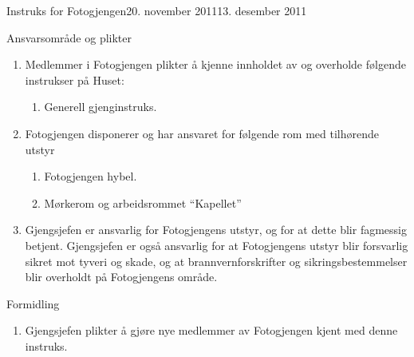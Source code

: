 \begin{instruks}{Instruks for Fotogjengen}{20. november 2011}{13. desember 2011}
    \begin{instruksledd}{Ansvarsområde og plikter}
        \begin{enumerate}
            \item Medlemmer i Fotogjengen plikter å kjenne innholdet av og overholde følgende instrukser
                på Huset:
                \begin{enumerate}
                    \item Generell gjenginstruks.
                \end{enumerate}
            \item Fotogjengen disponerer og har ansvaret for følgende rom med tilhørende utstyr
                \begin{enumerate}
                    \item Fotogjengen hybel.
                    \item Mørkerom og arbeidsrommet ``Kapellet''
                \end{enumerate}
            \item Gjengsjefen er ansvarlig for Fotogjengens utstyr, og for at dette blir fagmessig
                betjent. Gjengsjefen er også ansvarlig for at Fotogjengens utstyr blir forsvarlig sikret mot tyveri og skade, og at
                brannvernforskrifter og sikringsbestemmelser blir overholdt på Fotogjengens område.
        \end{enumerate}
    \end{instruksledd}
    
    \begin{instruksledd}{Formidling}
        \begin{enumerate}
            \item Gjengsjefen plikter å gjøre nye medlemmer av Fotogjengen kjent med denne
                instruks.
        \end{enumerate}
    \end{instruksledd}

\end{instruks}
